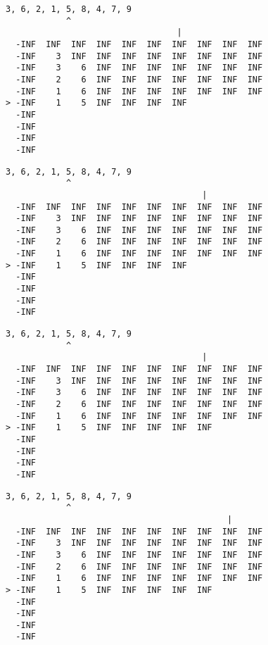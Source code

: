 { \begin{verbatim}
3, 6, 2, 1, 5, 8, 4, 7, 9
            ^
                                  |
  -INF  INF  INF  INF  INF  INF  INF  INF  INF  INF
  -INF    3  INF  INF  INF  INF  INF  INF  INF  INF
  -INF    3    6  INF  INF  INF  INF  INF  INF  INF
  -INF    2    6  INF  INF  INF  INF  INF  INF  INF
  -INF    1    6  INF  INF  INF  INF  INF  INF  INF
> -INF    1    5  INF  INF  INF  INF               
  -INF                                             
  -INF                                             
  -INF                                             
  -INF                                             
\end{verbatim} }

{ \begin{verbatim}
3, 6, 2, 1, 5, 8, 4, 7, 9
            ^
                                       |
  -INF  INF  INF  INF  INF  INF  INF  INF  INF  INF
  -INF    3  INF  INF  INF  INF  INF  INF  INF  INF
  -INF    3    6  INF  INF  INF  INF  INF  INF  INF
  -INF    2    6  INF  INF  INF  INF  INF  INF  INF
  -INF    1    6  INF  INF  INF  INF  INF  INF  INF
> -INF    1    5  INF  INF  INF  INF               
  -INF                                             
  -INF                                             
  -INF                                             
  -INF                                             
\end{verbatim} }

{ \begin{verbatim}
3, 6, 2, 1, 5, 8, 4, 7, 9
            ^
                                       |
  -INF  INF  INF  INF  INF  INF  INF  INF  INF  INF
  -INF    3  INF  INF  INF  INF  INF  INF  INF  INF
  -INF    3    6  INF  INF  INF  INF  INF  INF  INF
  -INF    2    6  INF  INF  INF  INF  INF  INF  INF
  -INF    1    6  INF  INF  INF  INF  INF  INF  INF
> -INF    1    5  INF  INF  INF  INF  INF          
  -INF                                             
  -INF                                             
  -INF                                             
  -INF                                             
\end{verbatim} }

{ \begin{verbatim}
3, 6, 2, 1, 5, 8, 4, 7, 9
            ^
                                            |
  -INF  INF  INF  INF  INF  INF  INF  INF  INF  INF
  -INF    3  INF  INF  INF  INF  INF  INF  INF  INF
  -INF    3    6  INF  INF  INF  INF  INF  INF  INF
  -INF    2    6  INF  INF  INF  INF  INF  INF  INF
  -INF    1    6  INF  INF  INF  INF  INF  INF  INF
> -INF    1    5  INF  INF  INF  INF  INF          
  -INF                                             
  -INF                                             
  -INF                                             
  -INF                                             
\end{verbatim} }

